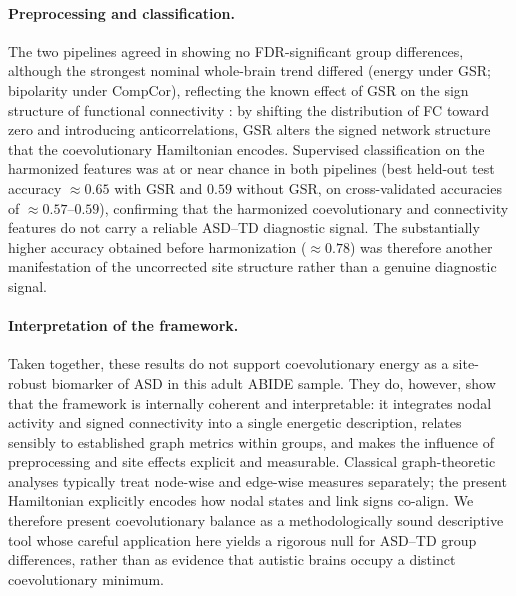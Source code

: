 \documentclass[10pt,letterpaper]{article}
\begin{document}
\paragraph*{Preprocessing and classification.}
The two pipelines agreed in showing no FDR-significant group differences, although the strongest
nominal whole-brain trend differed (energy under GSR; bipolarity under CompCor), reflecting the known
effect of GSR on the sign structure of functional connectivity \cite{Murphy2009,Fox2009,Chang2009}:
by shifting the distribution of FC toward zero and introducing anticorrelations, GSR alters the
signed network structure that the coevolutionary Hamiltonian encodes. Supervised classification on
the harmonized features was at or near chance in both pipelines (best held-out test accuracy
$\approx 0.65$ with GSR and $0.59$ without GSR, on cross-validated accuracies of $\approx 0.57$--$0.59$),
confirming that the harmonized coevolutionary and connectivity features do not carry a reliable
ASD--TD diagnostic signal. The substantially higher accuracy obtained before harmonization
($\approx 0.78$) was therefore another manifestation of the uncorrected site structure rather than a
genuine diagnostic signal.

\paragraph*{Interpretation of the framework.}
Taken together, these results do not support coevolutionary energy as a site-robust biomarker of ASD
in this adult ABIDE sample. They do, however, show that the framework is internally coherent and
interpretable: it integrates nodal activity and signed connectivity into a single energetic
description, relates sensibly to established graph metrics within groups, and makes the influence of
preprocessing and site effects explicit and measurable. Classical graph-theoretic analyses typically
treat node-wise and edge-wise measures separately; the present Hamiltonian explicitly encodes how
nodal states and link signs co-align. We therefore present coevolutionary balance as a
methodologically sound descriptive tool whose careful application here yields a rigorous null for
ASD--TD group differences, rather than as evidence that autistic brains occupy a distinct
coevolutionary minimum.
\end{document}
